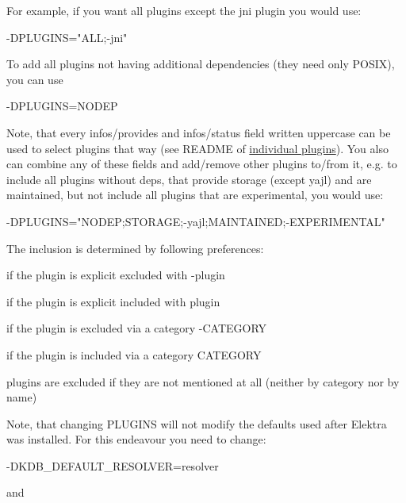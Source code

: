 For example, if you want all plugins except the jni plugin you would use\+:


\begin{DoxyCode}
-DPLUGINS="ALL;-jni"
\end{DoxyCode}


To add all plugins not having additional dependencies (they need only P\+O\+S\+IX), you can use


\begin{DoxyCode}
-DPLUGINS=NODEP
\end{DoxyCode}


Note, that every {\ttfamily infos/provides} and {\ttfamily infos/status} field written uppercase can be used to select plugins that way (see R\+E\+A\+D\+ME of \hyperlink{src_plugins_README_md}{individual plugins}). You also can combine any of these fields and add/remove other plugins to/from it, e.\+g. to include all plugins without deps, that provide storage (except {\ttfamily yajl}) and are maintained, but not include all plugins that are experimental, you would use\+:


\begin{DoxyCode}
-DPLUGINS="NODEP;STORAGE;-yajl;MAINTAINED;-EXPERIMENTAL"
\end{DoxyCode}


The inclusion is determined by following preferences\+:


\begin{DoxyEnumerate}
\item if the plugin is explicit excluded with {\ttfamily -\/plugin}
\item if the plugin is explicit included with {\ttfamily plugin}
\item if the plugin is excluded via a category {\ttfamily -\/\+C\+A\+T\+E\+G\+O\+RY}
\item if the plugin is included via a category {\ttfamily C\+A\+T\+E\+G\+O\+RY}
\item plugins are excluded if they are not mentioned at all (neither by category nor by name)
\end{DoxyEnumerate}

Note, that changing {\ttfamily P\+L\+U\+G\+I\+NS} will not modify the defaults used after Elektra was installed. For this endeavour you need to change\+:


\begin{DoxyCode}
-DKDB\_DEFAULT\_RESOLVER=resolver
\end{DoxyCode}


and



